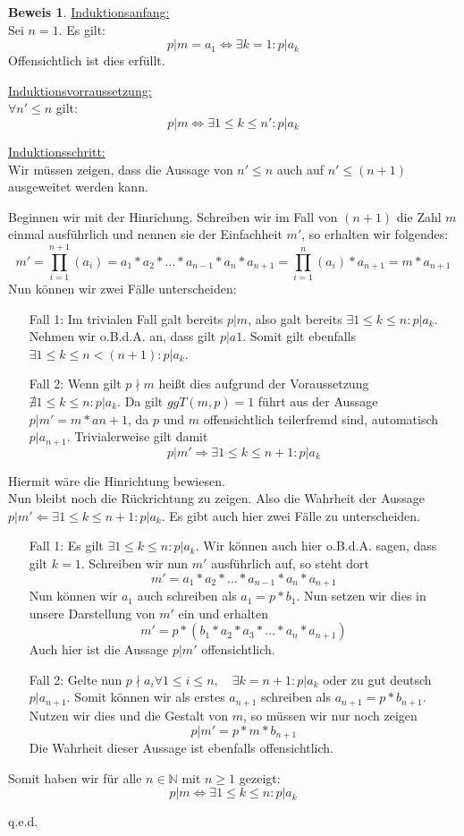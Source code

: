 \documentclass{article}
\newcommand*{\7}{\textbackslash}
\newcommand*{\N}{{\mathbb{N}}}
\theoremstyle{remark}
\theoremstyle{definition}
\newtheorem*{Beweis}{Beweis}
\begin{document}
	\begin{Beweis}
		\underline{Induktionsanfang:}\\
		Sei $n=1$. Es gilt:
		\[p|m=a_1\Leftrightarrow\exists k=1: p|a_k\]
		Offensichtlich ist dies erf\"ullt.

		\underline{Induktionsvorraussetzung:}\\
		$\forall n'\leq{n}$ gilt:
		\[p|m\Leftrightarrow\exists 1\leq{k}\leq{n'}:p|a_k\]

		\underline{Induktionsschritt:}\\
		Wir m\"ussen zeigen, dass die Aussage von $n'\leq{n}$ auch auf $n'\leq(n+1)$ ausgeweitet werden kann.

		Beginnen wir mit der Hinrichung. Schreiben wir im Fall von $(n+1)$ die Zahl $m$ einmal ausf\"uhrlich und nennen sie der Einfachheit $m'$, so erhalten wir folgendes:
		\[m'=\prod_{i=1}^{n+1}(a_i)=a_1*a_2*\dots{}*a_{n-1}*a_n*a_{n+1}=\prod_{i=1}^{n}(a_i)*a_{n+1}=m*a_{n+1}\]
		Nun k\"onnen wir zwei F\"alle unterscheiden:
		\begin{enumerate}
 			\item[Fall 1:] Im trivialen Fall galt bereits $p|m$, also galt bereits $\exists 1\leq{k}\leq{n}:p|a_k$. Nehmen wir o.B.d.A. an, dass gilt $p|a1$. Somit gilt ebenfalls $\exists 1\leq{k}\leq{n}<(n+1):p|a_k$.
			\item[Fall 2:] Wenn gilt $p\nmid{}m$ hei\ss{}t dies aufgrund der Voraussetzung $\nexists 1\leq{k}\leq{n}:p|a_k$. Da gilt $ggT(m,p)=1$ f\"uhrt aus der Aussage $p|m'=m*a{n+1}$, da $p$ und $m$ offensichtlich teilerfremd sind, automatisch $p|a_{n+1}$. Trivialerweise gilt damit 
			\[p|m'\Rightarrow\exists 1\leq{k}\leq{n+1}:p|a_k\]
		\end{enumerate}
		Hiermit w\"are die Hinrichtung bewiesen.\\
		Nun bleibt noch die R\"uckrichtung zu zeigen. Also die Wahrheit der Aussage $p|m'\Leftarrow\exists 1\leq{k}\leq{n+1}:p|a_k$. Es gibt auch hier zwei F\"alle zu unterscheiden.
		\begin{enumerate}
 			\item[Fall 1:] Es gilt $\exists 1\leq{k}\leq{n}:p|a_k$. Wir k\"onnen auch hier o.B.d.A. sagen, dass gilt $k=1$. Schreiben wir nun $m'$ ausf\"uhrlich auf, so steht dort
			\[m'=a_1*a_2*\dots{}*a_{n-1}*a_n*a_{n+1}\]
			Nun k\"onnen wir $a_1$ auch schreiben als $a_1=p*b_1$. Nun setzen wir dies in unsere Darstellung von $m'$ ein und erhalten
			\[m'=p*(b_1*a_2*a_3*\dots{}*a_n*a_{n+1})\]
			Auch hier ist die Aussage $p|m'$ offensichtlich.
			\item[Fall 2:] Gelte nun $p\nmid{a_i}\forall 1\leq{i}\leq{n},\quad\exists k=n+1:p|a_k$ oder zu gut deutsch $p|a_{n+1}$. Somit k\"onnen wir als erstes $a_{n+1}$ schreiben als $a_{n+1}=p*b_{n+1}$. Nutzen wir dies und die Gestalt von $m$, so m\"ussen wir nur noch zeigen
			\[p|m'=p*m*b_{n+1}\]
			Die Wahrheit dieser Aussage ist ebenfalls offensichtlich.
		\end{enumerate}
		Somit haben wir f\"ur alle $n\in\N$ mit $n\geq 1$ gezeigt:
		\[p|m\Leftrightarrow\exists 1\leq{k}\leq{n}:p|a_k\]
		\begin{flushright}
    			q.e.d.
		\end{flushright}
	\end{Beweis}
\end{document}
